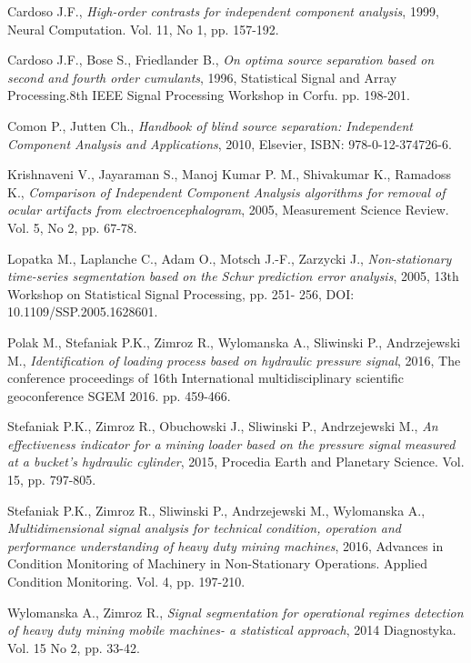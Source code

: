  \begin{thebibliography}{}
%
%

 Cardoso J.F., \emph{High-order contrasts for independent component analysis}, 1999, Neural Computation. Vol. 11, No 1, pp. 157-192.

 Cardoso J.F., Bose S., Friedlander B., \emph{On optima source separation based on second and fourth order cumulants}, 1996, Statistical Signal and Array Processing.8th IEEE Signal Processing Workshop in Corfu. pp. 198-201.

 Comon P., Jutten Ch., \emph{Handbook of blind source separation: Independent Component Analysis and Applications}, 2010, Elsevier, ISBN: 978-0-12-374726-6.

 Krishnaveni V., Jayaraman S., Manoj Kumar P. M., Shivakumar K., Ramadoss K., \emph{Comparison of Independent Component Analysis algorithms for removal of ocular artifacts from electroencephalogram}, 2005, Measurement Science Review. Vol. 5, No 2, pp. 67-78.

 Lopatka  M.,  Laplanche  C.,  Adam  O.,  Motsch  J.-F.,  Zarzycki  J.,  \emph{Non-stationary  time-series segmentation based on the Schur prediction error analysis},  2005, 13th Workshop on Statistical Signal Processing, pp. 251- 256, DOI: 10.1109/SSP.2005.1628601.

 Polak M., Stefaniak P.K., Zimroz R., Wylomanska A., Sliwinski P., Andrzejewski M., \emph{Identification of loading process based on hydraulic pressure signal}, 2016, The conference proceedings of 16th International multidisciplinary scientific geoconference SGEM 2016. pp. 459-466.

 Stefaniak P.K., Zimroz R., Obuchowski J., Sliwinski P., Andrzejewski M., \emph{An effectiveness indicator for a mining loader based on the pressure signal measured at a bucket's hydraulic cylinder}, 2015, Procedia Earth and Planetary Science. Vol. 15, pp. 797-805.

 Stefaniak P.K., Zimroz R., Sliwinski P., Andrzejewski M., Wylomanska A.,  \emph{Multidimensional signal analysis for technical condition, operation and performance understanding of heavy duty mining machines}, 2016, Advances in Condition Monitoring of Machinery in Non-Stationary Operations. Applied Condition Monitoring. Vol. 4, pp. 197-210.

 Wylomanska A., Zimroz R., \emph{Signal segmentation for operational regimes detection of heavy duty mining mobile machines- a statistical approach}, 2014 Diagnostyka. Vol. 15 No 2, pp. 33-42.




\end{thebibliography}


